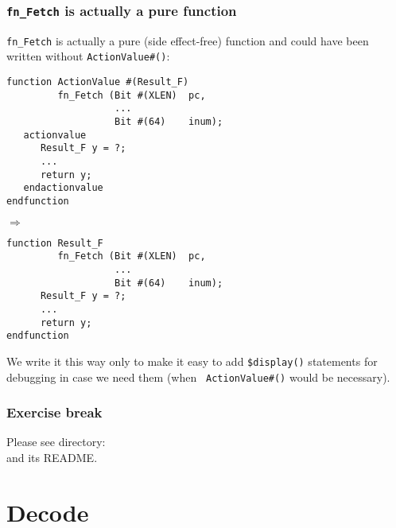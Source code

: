 \begin{frame}[fragile]
\frametitle{{\tt fn\_Fetch} is actually a pure function}

\footnotesize

{\tt fn\_Fetch} is actually a pure (side effect-free) function and
could have been written without {\tt ActionValue\#()}:

\vspace{2ex}

\begin{minipage}{0.45\textwidth}
 \begin{Verbatim}[frame=single]
function ActionValue #(Result_F)
         fn_Fetch (Bit #(XLEN)  pc,
                   ...
                   Bit #(64)    inum);
   actionvalue
      Result_F y = ?;
      ...
      return y;
   endactionvalue
endfunction
 \end{Verbatim}
\end{minipage}
\hfill
$\Longrightarrow$
\hfill
\begin{minipage}{0.45\textwidth}
 \begin{Verbatim}[frame=single]
function Result_F
         fn_Fetch (Bit #(XLEN)  pc,
                   ...
                   Bit #(64)    inum);
      Result_F y = ?;
      ...
      return y;
endfunction
 \end{Verbatim}
\end{minipage}

\vspace{2ex}

We write it this way only to make it easy to add {\tt \$display()}
statements for debugging in case we need them (when {\tt
ActionValue\#()} would be necessary).

\end{frame}


\begin{frame}
\frametitle{\EmojiExercise \hmm Exercise break}

Please see directory:  \\
and its README.

\end{frame}


\section{Decode}

